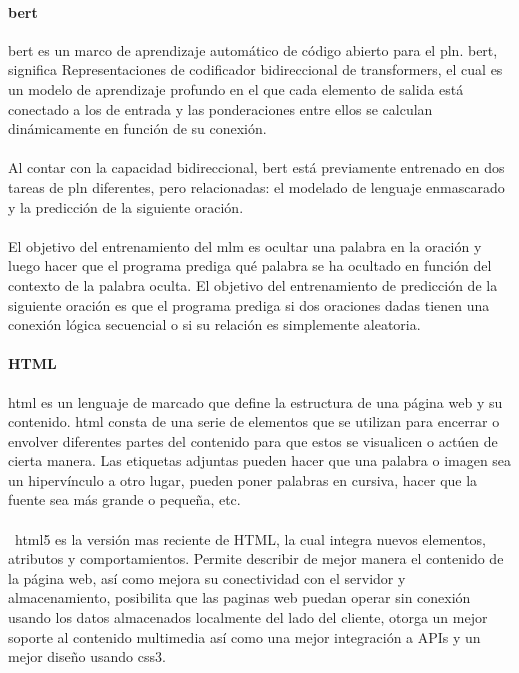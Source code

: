 \documentclass[12pt, a4paper, titlepage]{report}
\begin{document}
		   	\paragraph{\acrshort{bert} \\}
		   	\acrfull{bert} es un marco de aprendizaje automático de código abierto para el \acrfull{pln}. \acrshort{bert}, significa Representaciones de codificador bidireccional de transformers, el cual es un modelo de aprendizaje profundo en el que cada elemento de salida está conectado a los de entrada y las ponderaciones entre ellos se calculan dinámicamente en función de su conexión. \cite{refQueesBert} \\\\        
		   	Al contar con  la capacidad bidireccional, \acrshort{bert} está previamente entrenado en dos tareas de \acrshort{pln} diferentes, pero relacionadas: el modelado de lenguaje enmascarado y la predicción de la siguiente oración.\\\\        
		   	El objetivo del entrenamiento del \acrfull{mlm} es ocultar una palabra en la oración y luego hacer que el programa prediga qué palabra se ha ocultado en función del contexto de la palabra oculta. El objetivo del entrenamiento de predicción de la siguiente oración es que el programa prediga si dos oraciones dadas tienen una conexión lógica secuencial o si su relación es simplemente aleatoria.\par
		   	
		   	\paragraph{HTML\\}
		   	
		   	\acrfull{html} es un lenguaje de marcado que define la estructura de una página web y su contenido. \acrshort{html} consta de una serie de elementos que se utilizan para encerrar o envolver diferentes partes del contenido para que estos se visualicen o actúen de cierta manera. Las etiquetas adjuntas pueden hacer que una palabra o imagen sea un hipervínculo a otro lugar, pueden poner palabras en cursiva, hacer que la fuente sea más grande o pequeña, etc. \cite{refHtml} \\\\\
		   	\acrshort{html}5 es la versión mas reciente de HTML, la cual integra nuevos elementos, atributos y comportamientos. Permite describir de mejor manera el contenido de la página web, así como mejora su conectividad con el servidor y almacenamiento, posibilita que las paginas web puedan operar sin conexión usando los datos almacenados localmente del lado del cliente, otorga un mejor soporte al contenido multimedia así como una mejor integración a APIs y un mejor diseño usando \acrshort{css}3.	\cite{refHtml2}		
		   	
\end{document}
